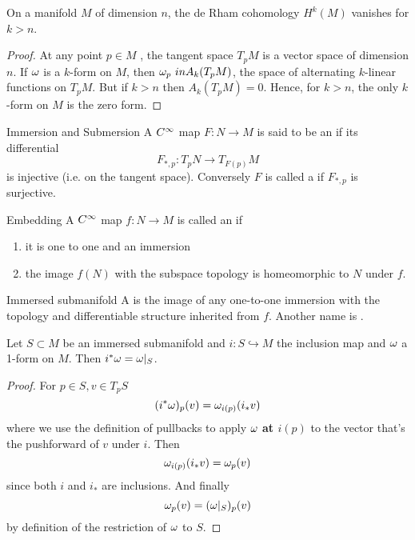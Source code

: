 \begin{proposition}{}{}
    On a manifold \(M\)  of dimension \(n\), the de Rham cohomology \(H^k(M)\) vanishes for \(k > n\).
\end{proposition}
\begin{proof}
    At any point \(p \in M\) , the tangent space \(T_p M\) is a vector space of dimension \(n\).
    If \(\omega\) is a \(k\)-form on \(M\), then \(\omega_p \ in A_k(T_p M)\), the space of alternating \(k\)-linear functions on \(T_p M\).
    But if \(k > n\) then \(A_k(T_p M) =0\).
    Hence, for \(k > n\), the only \(k\)-form on \(M\) is the zero form. 
\end{proof}

\begin{definition}{Immersion and Submersion}{}
    A \(C^\infty\) map \(F \colon N \rightarrow M\) is said to be an  if its differential 
    \[
        F_{*,p} \colon T_p N \rightarrow T_{F(p)} M  
    \]
    is injective (i.e. on the tangent space).
    Conversely \(F\) is called a  if \(F_{*,p}\) is surjective.
\end{definition}

\begin{definition}{Embedding}{}
    A \(C^\infty\) map \(f \colon N \rightarrow M\) is called an  if 
    \begin{enumerate}
        \item it is one to one and an immersion
        \item the image \(f(N)\) with the subspace topology is homeomorphic to \(N\) under \(f\).
    \end{enumerate}
\end{definition}

\begin{definition}{Immersed submanifold}{}
    A  is the image of any one-to-one immersion with the topology and differentiable structure inherited from \(f\).
    Another name is .
\end{definition}

\begin{proposition}{}{}
    Let \(S \subset M\) be an immersed submanifold and \(i \colon S \hookrightarrow M\) the inclusion map and \(\omega\) a 1-form on \(M\). 
    Then \(i^* \omega = \omega |_S\).
\end{proposition}
\begin{proof}
    For \(p \in S, v \in T_p S\) 
    \[
        (i^* \omega)_p (v) = \omega_{i(p)} (i_* v)
    \]
    where we use the definition of pullbacks to apply \(\omega\) \textbf{at \(i(p)\)} to the vector that's the pushforward of \(v\) under \(i\).
    Then 
    \[
        \omega_{i(p)} (i_* v) = \omega_p (v)
    \]
    since both \(i\) and \(i_*\) are inclusions. 
    And finally 
    \[
        \omega_p (v) = (\omega |_S)_p (v)    
    \]
    by definition of the restriction of \(\omega\) to \(S\).
\end{proof}


